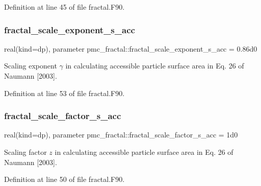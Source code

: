 Definition at line 45 of file fractal.\+F90.

\mbox{\label{namespacepmc__fractal_a37704d5061b9ee8a17187d37832a79c0}} 
\subsubsection{\texorpdfstring{fractal\+\_\+scale\+\_\+exponent\+\_\+s\+\_\+acc}{fractal\_scale\_exponent\_s\_acc}}
{\footnotesize\ttfamily real(kind=dp), parameter pmc\+\_\+fractal\+::fractal\+\_\+scale\+\_\+exponent\+\_\+s\+\_\+acc = 0.\+86d0}



Scaling exponent $\gamma$ in calculating accessible particle surface area in Eq. 26 of Naumann \mbox{[}2003\mbox{]}. 



Definition at line 53 of file fractal.\+F90.

\mbox{\label{namespacepmc__fractal_a163c8d35d3501518bf784a7a646c35c4}} 
\subsubsection{\texorpdfstring{fractal\+\_\+scale\+\_\+factor\+\_\+s\+\_\+acc}{fractal\_scale\_factor\_s\_acc}}
{\footnotesize\ttfamily real(kind=dp), parameter pmc\+\_\+fractal\+::fractal\+\_\+scale\+\_\+factor\+\_\+s\+\_\+acc = 1d0}



Scaling factor $z$ in calculating accessible particle surface area in Eq. 26 of Naumann \mbox{[}2003\mbox{]}. 



Definition at line 50 of file fractal.\+F90.

